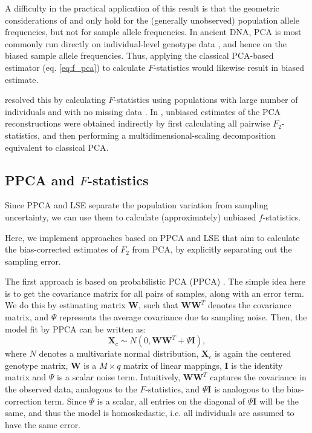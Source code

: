 \documentclass[12pt]{article}
\newcommand{\BW}{\mathbf{W}}
\newcommand{\BI}{\mathbf{I}}
\newcommand{\MX}{\mathbf{X}}
\begin{document}
A difficulty in the practical application of this result is that the geometric considerations of \cite{oteo-garcia_geometrical_2021} and \cite{peter_geometric_2022} only hold for the (generally unobserved) population allele frequencies, but not for sample allele frequencies. In ancient DNA, PCA is most commonly run directly on individual-level genotype data \citep{patterson_population_2006}, and hence on the biased sample allele frequencies. Thus, applying the classical PCA-based estimator (eq. \ref{eq:f_pca}) to calculate $F$-statistics would likewise result in biased estimate.


\cite{oteo-garcia_geometrical_2021} resolved this by calculating $F$-statistics using populations with large number of individuals and with no missing data \citep{oteo-garcia_geometrical_2021}. In \cite{peter_geometric_2022}, unbiased estimates of the PCA reconstructions were obtained indirectly by first calculating all pairwise $F_2$-statistics, and then performing a multidimensional-scaling decomposition equivalent to classical PCA. 

\subsection{PPCA and $F$-statistics}\label{theory-ppca}
Since PPCA and LSE separate the population variation from sampling uncertainty, we can use them to calculate (approximately) unbiased $f$-statistics.

Here, we implement approaches based on PPCA and LSE that aim to calculate the bias-corrected estimates of $F_2$ from  PCA, by explicitly separating out the sampling error.

The first approach is based on probabilistic PCA (PPCA) \citep{tipping_probabilistic_1999-1, agrawal_scalable_2020}. The simple idea here is to get the covariance matrix for all pairs of samples, along with an error term. We do this by estimating matrix $\BW$, such that $\mathbf{W}\mathbf{W}^T$ denotes the covariance matrix, and $\Psi$ represents the average covariance due to sampling noise. Then, the model fit by PPCA can be written as: 
\begin{equation*}
    \MX_c \sim N(0, \mathbf{W}\mathbf{W}^T + \Psi \BI),
\end{equation*} 
where $N$ denotes a multivariate normal distribution, $\MX_c$ is again the centered genotype matrix, $\mathbf{W}$ is a $M \times q$ matrix of linear mappings, $\BI$ is the identity matrix and $\Psi$ is a scalar noise term. Intuitively, $\mathbf{W}\mathbf{W}^T$ captures the covariance in the observed data, analogous to the $F$-statistics, and $\Psi \BI$ is analogous to the bias-correction term. Since $\Psi$ is a scalar, all entries on the diagonal of $\Psi \BI$ will be the same, and thus the model is homoskedastic, i.e. all individuals are assumed to have the same error.
\end{document}
